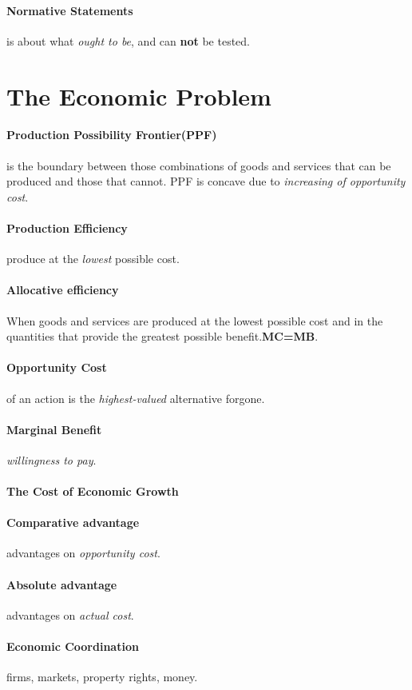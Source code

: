 \documentclass{article}
\begin{document}
	\paragraph{Normative Statements} is about what \emph{ought to be}, and can \textbf{not} be tested.
	\section{The Economic Problem}
	\paragraph{Production Possibility Frontier(PPF)} is the boundary between those combinations of goods and services that can be produced and those that cannot. PPF is concave due to \emph{increasing of opportunity cost}.
	\paragraph{Production Efficiency} produce at the \emph{lowest} possible cost.
	\paragraph{Allocative efficiency} When goods and services are produced at the lowest possible cost and in the quantities that provide the greatest possible benefit.\textbf{MC=MB}.
	\paragraph{Opportunity Cost} of an action is the \emph{highest-valued} alternative forgone.
	\paragraph{Marginal Benefit} \emph{willingness to pay}. 
	\paragraph{The Cost of Economic Growth}
	\paragraph{Comparative advantage} advantages on \emph{opportunity cost}.
	\paragraph{Absolute advantage} advantages on \emph{actual cost}.
	\paragraph{Economic Coordination} firms, markets, property rights, money.
\end{document}
